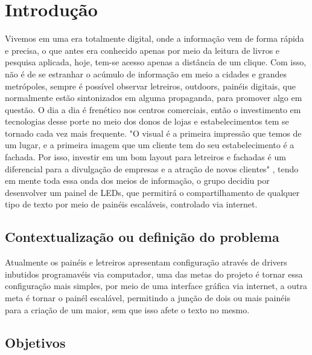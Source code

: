 \chapter{Introdução}
\label{sec:introdução}

\lettrine[lines=3]{V}{}ivemos em uma era totalmente digital, onde a informação vem de forma rápida e precisa, o que antes era conhecido apenas por meio da leitura de livros e pesquisa aplicada, hoje, tem-se acesso apenas a distância de um clique. Com isso, não é de se estranhar o acúmulo de informação em meio a cidades e grandes metrópoles, sempre é possível observar letreiros, outdoors, painéis digitais, que normalmente estão sintonizados em alguma propaganda, para promover algo em questão. O dia a dia é frenético nos centros comerciais, então o investimento em tecnologias desse porte no meio dos donos de lojas e estabelecimentos tem se tornado cada vez mais frequente. "O visual é a primeira impressão que temos de um lugar, e a primeira imagem que um cliente tem do seu estabelecimento é a fachada. Por isso, investir em um bom layout para letreiros e fachadas é um diferencial para a divulgação de empresas e  a atração de novos clientes" \cite{SPletras}, tendo em mente toda essa onda dos meios de informação, o grupo decidiu por desenvolver um painel de LEDs, que permitirá o compartilhamento de qualquer tipo de texto por meio de painéis escaláveis, controlado via internet.
 
\section{Contextualização ou definição do problema}
	
Atualmente os painéis e letreiros apresentam configuração através de drivers inbutidos programavéis via computador, uma das metas do projeto é tornar essa configuração mais simples, por meio de uma interface gráfica via internet, a outra meta é tornar o painél escalável, permitindo a junção de dois ou mais painéis para a criação de um maior, sem que isso afete o texto no mesmo.


\section{Objetivos}


